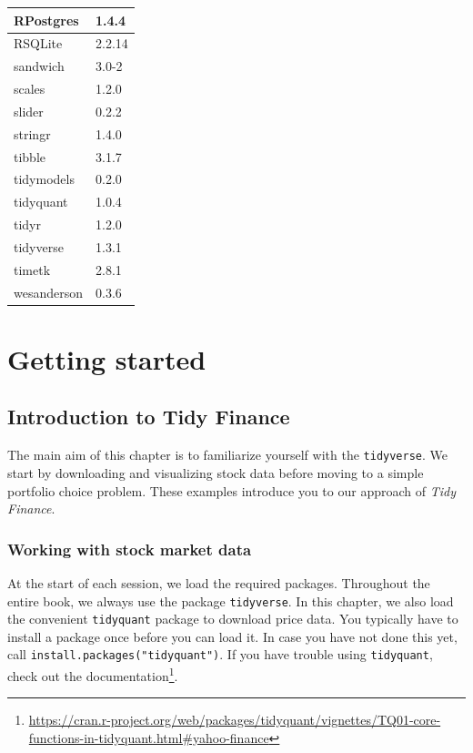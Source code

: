\documentclass[
]{book}
\renewcommand{\href}[2]{#2\footnote{\url{#1}}}
\begin{document}
\begin{tabular}[t]{l|l}
\hline
RPostgres & 1.4.4\\
\hline
RSQLite & 2.2.14\\
\hline
sandwich & 3.0-2\\
\hline
scales & 1.2.0\\
\hline
slider & 0.2.2\\
\hline
stringr & 1.4.0\\
\hline
tibble & 3.1.7\\
\hline
tidymodels & 0.2.0\\
\hline
tidyquant & 1.0.4\\
\hline
tidyr & 1.2.0\\
\hline
tidyverse & 1.3.1\\
\hline
timetk & 2.8.1\\
\hline
wesanderson & 0.3.6\\
\hline
\end{tabular}

\hypertarget{part-getting-started}{%
\part*{Getting started}\label{part-getting-started}}


\hypertarget{introduction-to-tidy-finance}{%
\chapter{Introduction to Tidy Finance}\label{introduction-to-tidy-finance}}

The main aim of this chapter is to familiarize yourself with the \texttt{tidyverse}. We start by downloading and visualizing stock data before moving to a simple portfolio choice problem. These examples introduce you to our approach of \emph{Tidy Finance}.

\hypertarget{working-with-stock-market-data}{%
\section{Working with stock market data}\label{working-with-stock-market-data}}

At the start of each session, we load the required packages.
Throughout the entire book, we always use the package \texttt{tidyverse}.
In this chapter, we also load the convenient \texttt{tidyquant} package to download price data.
You typically have to install a package once before you can load it. In case you have not done this yet, call \texttt{install.packages("tidyquant")}.
If you have trouble using \texttt{tidyquant}, check out the \href{https://cran.r-project.org/web/packages/tidyquant/vignettes/TQ01-core-functions-in-tidyquant.html\#yahoo-finance}{documentation}.
\end{document}
